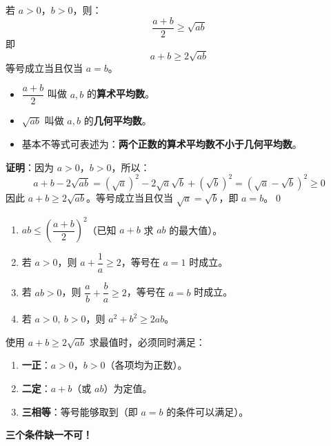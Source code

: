 \documentclass[12pt, a4paper]{ctexart}
\begin{document}
\begin{knowledgebox}
若 $a > 0$，$b > 0$，则：
\[
  \frac{a + b}{2} \geq \sqrt{ab}
\]
即
\[
  a + b \geq 2\sqrt{ab}
\]
等号成立当且仅当 $a = b$。
\begin{itemize}[leftmargin=2em]
  \item $\dfrac{a+b}{2}$ 叫做 $a, b$ 的\textbf{算术平均数}。
  \item $\sqrt{ab}$ 叫做 $a, b$ 的\textbf{几何平均数}。
  \item 基本不等式可表述为：\textbf{两个正数的算术平均数不小于几何平均数}。
\end{itemize}
\end{knowledgebox}

\begin{knowledgebox}[基本不等式的证明]
\textbf{证明}：因为 $a > 0$，$b > 0$，所以：
\[
  a + b - 2\sqrt{ab} = (\sqrt{a})^2 - 2\sqrt{a}\sqrt{b} + (\sqrt{b})^2 = (\sqrt{a} - \sqrt{b})^2 \geq 0
\]
因此 $a + b \geq 2\sqrt{ab}$。等号成立当且仅当 $\sqrt{a} = \sqrt{b}$，即 $a = b$。\qed
\end{knowledgebox}

\begin{knowledgebox}[基本不等式的常见变形与推论]
\begin{enumerate}[leftmargin=2em]
  \item $ab \leq \left(\dfrac{a+b}{2}\right)^2$（已知 $a + b$ 求 $ab$ 的最大值）。
  \item 若 $a > 0$，则 $a + \dfrac{1}{a} \geq 2$，等号在 $a = 1$ 时成立。
  \item 若 $ab > 0$，则 $\dfrac{a}{b} + \dfrac{b}{a} \geq 2$，等号在 $a = b$ 时成立。
  \item 若 $a > 0,\ b > 0$，则 $a^2 + b^2 \geq 2ab$。
\end{enumerate}
\end{knowledgebox}

\begin{warnbox}
使用 $a + b \geq 2\sqrt{ab}$ 求最值时，必须同时满足：
\begin{enumerate}[leftmargin=2em]
  \item \textbf{一正}：$a > 0$，$b > 0$（各项均为正数）。
  \item \textbf{二定}：$a + b$（或 $ab$）为定值。
  \item \textbf{三相等}：等号能够取到（即 $a = b$ 的条件可以满足）。
\end{enumerate}
\textbf{三个条件缺一不可！}
\end{warnbox}
\end{document}

